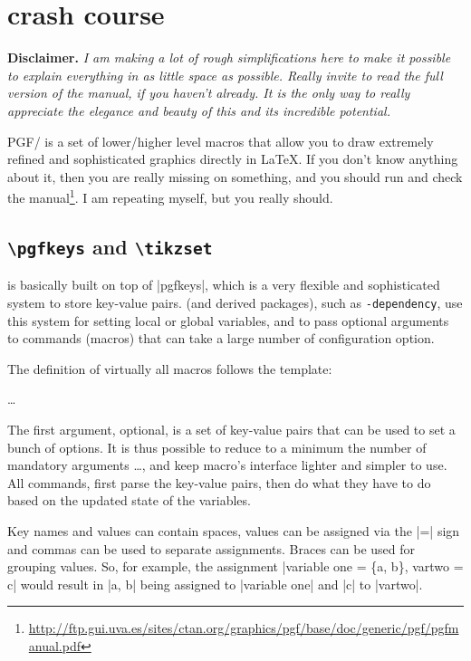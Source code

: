 \documentclass[a4paper]{ltxdoc}
\newcommand{\cmdname}[1]{\texttt{\color{red!75!black}\detokenize{#1}}}
\def\pkgname{\tikzname{}\texttt{-dependency}}
\newcommand{\options}[1][key-value-pairs]{\opt{\oarg{#1}}}
\begin{document}
\appendix

\section{\tikzname{} crash course} \label{sec:tikz}

\textbf{Disclaimer.} \textit{I am making a lot of rough simplifications here to make it possible to explain everything in as little space as possible. Really invite to read the full version of the manual, if you haven't already. It is the only way to really appreciate the elegance and beauty of this \tikzname{} and its incredible potential.}

\vspace{1cm}

PGF/\tikzname{} is a set of lower/higher level macros that allow you to draw extremely refined and sophisticated graphics directly in \LaTeX{}. If you don't know anything about it, then you are really missing on something, and you should run and check the manual\footnote{\url{http://ftp.gui.uva.es/sites/ctan.org/graphics/pgf/base/doc/generic/pgf/pgfmanual.pdf}}. I am repeating myself, but you really should.

\subsection{\texttt{\textbackslash pgfkeys} and \texttt{\textbackslash tikzset}}

\tikzname{} is basically built on top of |pgfkeys|, which is a very flexible and sophisticated system to store key-value pairs. \tikzname{} (and derived packages), such as \pkgname{}, use this system for setting local or global variables, and to pass optional arguments to commands (macros) that can take a large number of configuration option. 

The definition of virtually all \tikzname{} macros follows the template:

\cmdname\somecommand\options{}\dots{}

The first argument, optional, is a set of key-value pairs that can be used to set a bunch of options. It is thus possible to reduce to a minimum the number of mandatory arguments \dots{}, and keep macro's interface lighter and simpler to use. All commands, first parse the key-value pairs, then do what they have to do based on the updated state of the variables.

Key names and values can contain spaces, values can be assigned via the |=| sign and commas can be used to separate assignments. Braces can be used for grouping values. So, for example, the assignment |variable one = \{a, b\}, vartwo = c| would result in |a, b| being assigned to |variable one| and |c| to |vartwo|.
\end{document}
